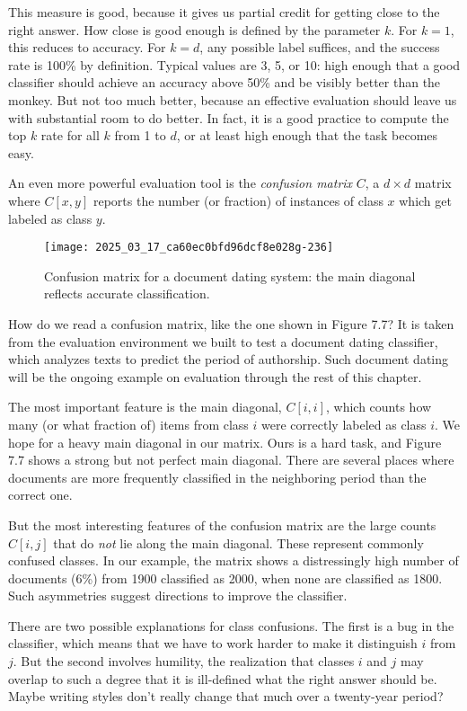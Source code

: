 \documentclass[10pt]{article}
\begin{document}
This measure is good, because it gives us partial credit for getting close to the right answer. How close is good enough is defined by the parameter \(k\). For \(k=1\), this reduces to accuracy. For \(k=d\), any possible label suffices, and the success rate is 100\% by definition. Typical values are 3, 5, or 10: high enough that a good classifier should achieve an accuracy above 50\% and be visibly better than the monkey. But not too much better, because an effective evaluation should leave us with substantial room to do better. In fact, it is a good practice to compute the top \(k\) rate for all \(k\) from 1 to \(d\), or at least high enough that the task becomes easy.

An even more powerful evaluation tool is the \textit{confusion matrix} \(C\), a \(d \times d\) matrix where \(C[x, y]\) reports the number (or fraction) of instances of class \(x\) which get labeled as class \(y\).

\begin{figure}[h]
\centering
\texttt{[image: 2025\_03\_17\_ca60ec0bfd96dcf8e028g-236]}
\caption{Confusion matrix for a document dating system: the main diagonal reflects accurate classification.}
\end{figure}

How do we read a confusion matrix, like the one shown in Figure 7.7? It is taken from the evaluation environment we built to test a document dating classifier, which analyzes texts to predict the period of authorship. Such document dating will be the ongoing example on evaluation through the rest of this chapter.

The most important feature is the main diagonal, \(C[i, i]\), which counts how many (or what fraction of) items from class \(i\) were correctly labeled as class \(i\). We hope for a heavy main diagonal in our matrix. Ours is a hard task, and Figure 7.7 shows a strong but not perfect main diagonal. There are several places where documents are more frequently classified in the neighboring period than the correct one.

But the most interesting features of the confusion matrix are the large counts \(C[i, j]\) that do \textit{not} lie along the main diagonal. These represent commonly confused classes. In our example, the matrix shows a distressingly high number of documents (6\%) from 1900 classified as 2000, when none are classified as 1800. Such asymmetries suggest directions to improve the classifier.

There are two possible explanations for class confusions. The first is a bug in the classifier, which means that we have to work harder to make it distinguish \(i\) from \(j\). But the second involves humility, the realization that classes \(i\) and \(j\) may overlap to such a degree that it is ill-defined what the right answer should be. Maybe writing styles don’t really change that much over a twenty-year period?
\end{document}
